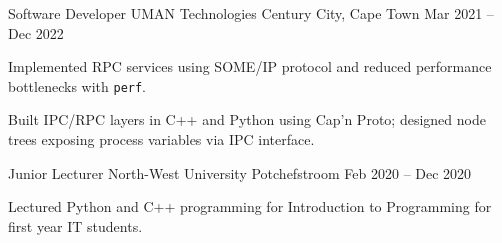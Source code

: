 \begin{cventries}
  \cventry
  {Software Developer}
  {UMAN Technologies}
  {Century City, Cape Town}
  {Mar 2021 -- Dec 2022}
  {
    \begin{cvitems}
      \item Implemented RPC services using SOME/IP protocol and reduced performance bottlenecks with \texttt{perf}.
      \item Built IPC/RPC layers in C++ and Python using Cap'n Proto; designed node trees exposing process variables via IPC interface.
    \end{cvitems}
  }

  \cventry
  {Junior Lecturer}
  {North-West University}
  {Potchefstroom}
  {Feb 2020 -- Dec 2020}
  {
    \begin{cvitems}
      \item Lectured Python and C++ programming for Introduction to Programming for first year IT students.
      \\
    \end{cvitems}
  }

\end{cventries}
